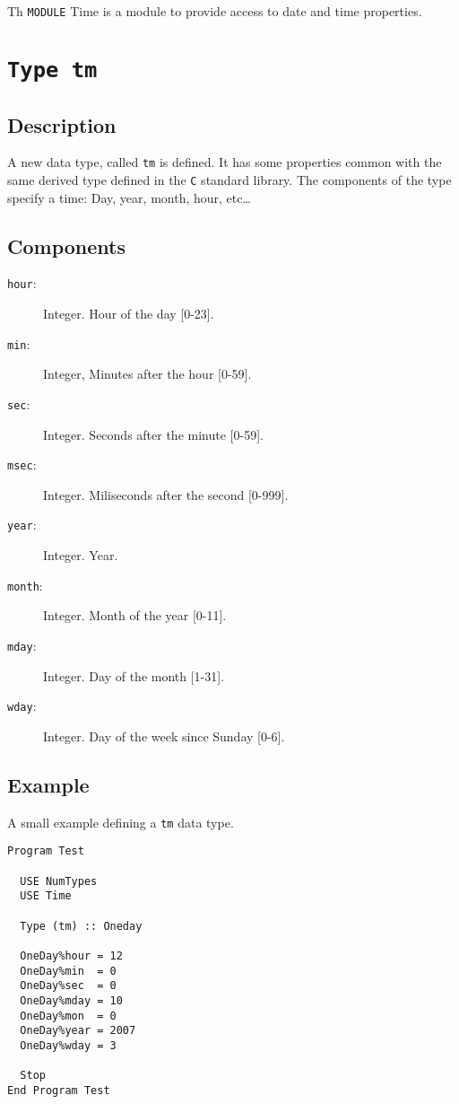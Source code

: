 Th \texttt{MODULE} Time is a module to provide access to date and
time properties.

\section{\texttt{Type tm}}

\subsection{Description}

A new data type, called \texttt{tm} is defined. It has some properties
common with the same derived type defined in the \texttt{C} standard
library. The components of the type specify a time: Day, year, month,
hour, etc\dots

\subsection{Components}

\begin{description}
\item[\texttt{hour}: ] Integer. Hour of the day [0-23].
\item[\texttt{min}: ] Integer, Minutes after the hour [0-59].
\item[\texttt{sec}: ] Integer. Seconds after the minute [0-59].
\item[\texttt{msec}: ] Integer. Miliseconds after the second [0-999].
\item[\texttt{year}: ] Integer. Year.
\item[\texttt{month}: ] Integer. Month of the year [0-11].
\item[\texttt{mday}: ] Integer. Day of the month [1-31].
\item[\texttt{wday}: ] Integer. Day of the week since Sunday [0-6].
\end{description}

\subsection{Example}

A small example defining a \texttt{tm} data type.

\begin{verbatim}
Program Test

  USE NumTypes
  USE Time

  Type (tm) :: Oneday

  OneDay%hour = 12
  OneDay%min  = 0
  OneDay%sec  = 0
  OneDay%mday = 10
  OneDay%mon  = 0
  OneDay%year = 2007
  OneDay%wday = 3

  Stop
End Program Test
\end{verbatim}

